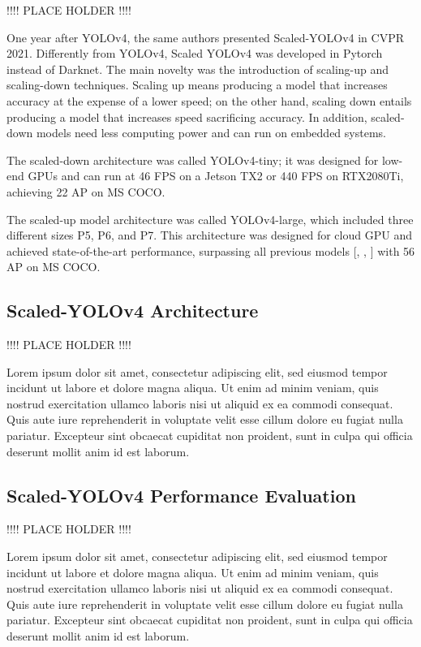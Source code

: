 \documentclass{article}
\begin{document}
!!!! PLACE HOLDER !!!!

One year after YOLOv4, the same authors presented Scaled-YOLOv4 \cite{wang2021scaled} in CVPR 2021. Differently from YOLOv4, Scaled YOLOv4 was developed in Pytorch instead of Darknet. The main novelty was the introduction of scaling-up and scaling-down techniques. Scaling up means producing a model that increases accuracy at the expense of a lower speed; on the other hand, scaling down entails producing a model that increases speed sacrificing accuracy. In addition, scaled-down models need less computing power and can run on embedded systems.

The scaled-down architecture was called YOLOv4-tiny; it was designed for low-end GPUs and can run at 46 FPS on a Jetson TX2 or 440 FPS on RTX2080Ti, achieving 22 AP on MS COCO.

The scaled-up model architecture was called YOLOv4-large, which included three different sizes P5, P6, and P7. This architecture was designed for cloud GPU and achieved state-of-the-art performance, surpassing all previous models [\cite{9156454}, \cite{8417976}, \cite{long2020pp}] with 56 AP on MS COCO.

\subsection{Scaled-YOLOv4 Architecture}

!!!! PLACE HOLDER !!!!

Lorem ipsum dolor sit amet, consectetur adipiscing elit, sed eiusmod tempor incidunt ut labore et dolore magna aliqua. Ut enim ad minim veniam, quis nostrud exercitation ullamco laboris nisi ut aliquid ex ea commodi consequat. Quis aute iure reprehenderit in voluptate velit esse cillum dolore eu fugiat nulla pariatur. Excepteur sint obcaecat cupiditat non proident, sunt in culpa qui officia deserunt mollit anim id est laborum.

\subsection{Scaled-YOLOv4 Performance Evaluation}

!!!! PLACE HOLDER !!!!

Lorem ipsum dolor sit amet, consectetur adipiscing elit, sed eiusmod tempor incidunt ut labore et dolore magna aliqua. Ut enim ad minim veniam, quis nostrud exercitation ullamco laboris nisi ut aliquid ex ea commodi consequat. Quis aute iure reprehenderit in voluptate velit esse cillum dolore eu fugiat nulla pariatur. Excepteur sint obcaecat cupiditat non proident, sunt in culpa qui officia deserunt mollit anim id est laborum.
\end{document}
